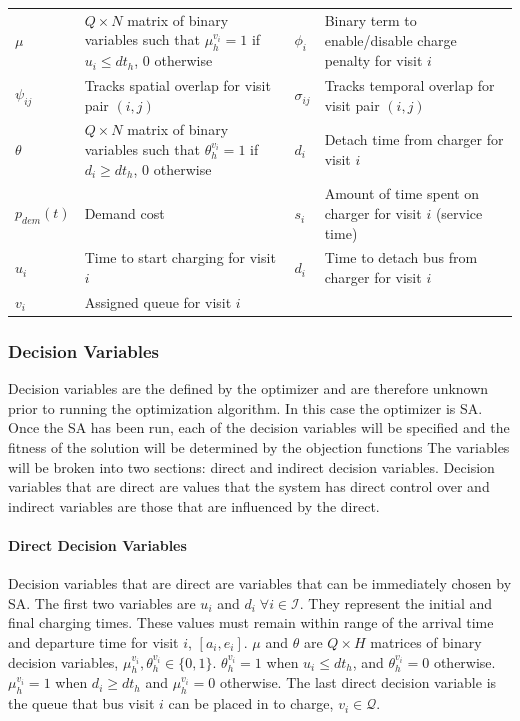 \documentclass[11pt,a4paper,final]{article}
\newcommand{\Iset}{\mathcal{I}}             %
\newcommand{\Qset}{\mathcal{Q}}             %
\begin{document}
\begin{table}[htbp]
\begin{tabularx}{\textwidth}{L{0.3} L{1.2} L{0.3} L{1.2}}
\(\mu\) & \(Q \times N\) matrix of binary variables such that \(\mu_h^{v_i} = 1\) if \(u_i \le dt_h\), 0 otherwise & \(\phi_i\) & Binary term to enable/disable charge penalty for visit \(i\)\\[0pt]
\(\psi_{ij}\) & Tracks spatial overlap for visit pair \((i,j)\) & \(\sigma_{ij}\) & Tracks temporal overlap for visit pair \((i,j)\)\\[0pt]
\(\theta\) & \(Q \times N\) matrix of binary variables such that \(\theta_h^{v_i} = 1\) if \(d_i \ge dt_h\), 0 otherwise & \(d_i\) & Detach time from charger for visit \(i\)\\[0pt]
\(p_{dem}(t)\) & Demand cost & \(s_i\) & Amount of time spent on charger for visit \(i\) (service time)\\[0pt]
\(u_i\) & Time to start charging for visit \(i\) & \(d_i\) & Time to detach bus from charger for visit \(i\)\\[0pt]
\(v_i\) & Assigned queue for visit \(i\) &  & \\[0pt]
\hline
\end{tabularx}
\end{table}

\subsubsection{Decision Variables}
\label{sec:decision-variables}
Decision variables are the defined by the optimizer and are therefore unknown prior to running the optimization
algorithm. In this case the optimizer is SA. Once the SA has been run, each of the decision variables will be specified and
the fitness of the solution will be determined by the objection functions The variables will be broken into two
sections: direct and indirect decision variables. Decision variables that are direct are values that the system has
direct control over and indirect variables are those that are influenced by the direct.

\paragraph{Direct Decision Variables}
\label{sec:direct-decision-variables}
Decision variables that are direct are variables that can be immediately chosen by SA. The first two variables are \(u_i\)
and \(d_i \; \forall i \in \Iset\). They represent the initial and final charging times. These values must remain within range of
the arrival time and departure time for visit \(i\), \([a_i, e_i]\). \(\mu\) and \(\theta\) are \(Q \times H\) matrices of binary decision
variables, \(\mu_h^{v_i}, \theta_h^{v_i} \in \{0, 1\}\). \(\theta_h^{v_i} = 1\) when \(u_i \le dt_h\), and \(\theta_h^{v_i} = 0\) otherwise.
\(\mu_h^{v_i} = 1\) when \(d_i \ge dt_h\) and \(\mu_h^{v_i} = 0\) otherwise. The last direct decision variable is the queue that bus
visit \(i\) can be placed in to charge, \(v_i \in \Qset\).
\end{document}
